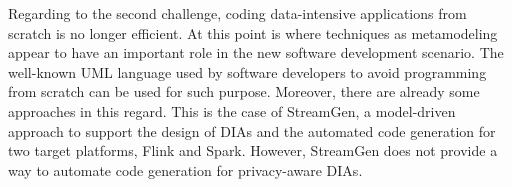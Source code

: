 Regarding to the second challenge, coding data-intensive applications from scratch is no longer efficient. At this point is where techniques as metamodeling appear to have an important role in the new software development scenario. The well-known UML language used by software developers to avoid programming from scratch can be used for such purpose. Moreover, there are already some approaches in this regard. This is the case of StreamGen, a model-driven approach to support the design of DIAs and the automated code generation for two target platforms, Flink and Spark. However, StreamGen does not provide a way to automate code generation for privacy-aware DIAs.












